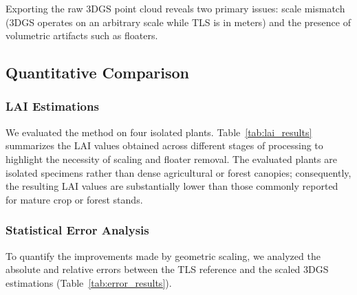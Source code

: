 \documentclass[10pt,twocolumn,letterpaper]{article}
\begin{document}
Exporting the raw 3DGS point cloud reveals two primary issues: scale mismatch (3DGS operates on an arbitrary scale while TLS is in meters) and the presence of volumetric artifacts such as floaters.

\subsection{Quantitative Comparison}

\subsubsection{LAI Estimations}
We evaluated the method on four isolated plants. Table~\ref{tab:lai_results} summarizes the LAI values obtained across different stages of processing to highlight the necessity of scaling and floater removal. The evaluated plants are isolated specimens rather than dense agricultural or forest canopies; consequently, the resulting LAI values are substantially lower than those commonly reported for mature crop or forest stands.

\begin{table}[htbp]
\caption{LAI Estimations using FDTLS Across Processing Stages}
\begin{center}
\renewcommand{\arraystretch}{1.3}
\label{tab:lai_results}
\end{center}
\end{table}

\subsubsection{Statistical Error Analysis}
To quantify the improvements made by geometric scaling, we analyzed the absolute and relative errors between the TLS reference and the scaled 3DGS estimations (Table~\ref{tab:error_results}). 
\end{document}
